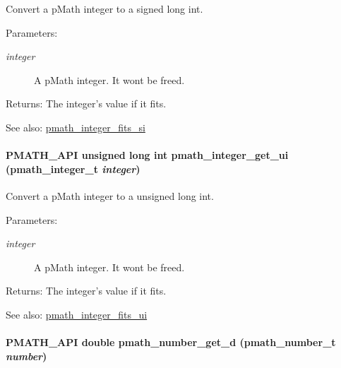 Convert a pMath integer to a signed long int. 

\begin{Desc}
\item[Parameters:]
\begin{description}
\item[{\em integer}]A pMath integer. It wont be freed. \end{description}
\end{Desc}
\begin{Desc}
\item[Returns:]The integer's value if it fits.\end{Desc}
\begin{Desc}
\item[See also:]\hyperlink{group__numbers_gc220e06754067b9ba4a7c823017ad32e}{pmath\_\-integer\_\-fits\_\-si} \end{Desc}
\hypertarget{group__numbers_g0aed3b6f38410b7e42ffa52be73c6ea6}{
\paragraph[{pmath\_\-integer\_\-get\_\-ui}]{\setlength{\rightskip}{0pt plus 5cm}PMATH\_\-API unsigned long int pmath\_\-integer\_\-get\_\-ui ({\bf pmath\_\-integer\_\-t} {\em integer})}\hfill}
\label{group__numbers_g0aed3b6f38410b7e42ffa52be73c6ea6}


Convert a pMath integer to a unsigned long int. 

\begin{Desc}
\item[Parameters:]
\begin{description}
\item[{\em integer}]A pMath integer. It wont be freed. \end{description}
\end{Desc}
\begin{Desc}
\item[Returns:]The integer's value if it fits.\end{Desc}
\begin{Desc}
\item[See also:]\hyperlink{group__numbers_gb12e5e34b7918cb6beee23c57cdd0d36}{pmath\_\-integer\_\-fits\_\-ui} \end{Desc}
\hypertarget{group__numbers_g62617cbeeedaff88caaafec1dc84f329}{
\paragraph[{pmath\_\-number\_\-get\_\-d}]{\setlength{\rightskip}{0pt plus 5cm}PMATH\_\-API double pmath\_\-number\_\-get\_\-d ({\bf pmath\_\-number\_\-t} {\em number})}\hfill}
\label{group__numbers_g62617cbeeedaff88caaafec1dc84f329}


